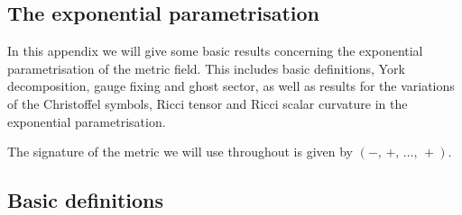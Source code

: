 \documentclass[11pt]{book}
\numberwithin{equation}{chapter}
\begin{document}
\appendix
\begin{appendices}

\chapter{The exponential parametrisation}
\label{app:exp_param}

In this appendix we will give some basic results concerning the exponential parametrisation
of the metric field. This includes basic definitions, York decomposition, gauge fixing and
ghost sector, as well as results for the variations of the Christoffel symbols, Ricci tensor
and Ricci scalar curvature in the exponential parametrisation.

The signature of the metric we will use throughout is given by $(-,\, +,\, \dots,\, +)$.

\section{Basic definitions}


\end{appendices}
\end{document}
